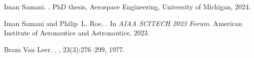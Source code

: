 \documentclass[12pt,a4paper]{article}
\begin{document}
\begin{thebibliography}{LMMW00}
Iman Samani.
.
\newblock PhD thesis, Aerospace Engineering, University of Michigan, 2024.

Iman Samani and Philip~L. Roe.
.
\newblock In {\em AIAA SCITECH 2023 Forum}. American Institute of Aeronautics
  and Astronautics, 2023.

Bram {Van Leer}.
.
, 23(3):276--299, 1977.

\end{thebibliography}
\end{document}
